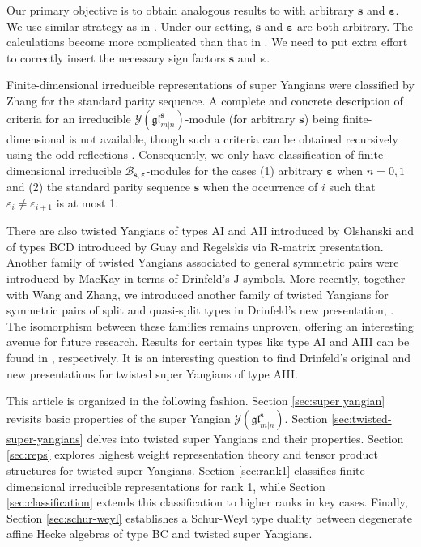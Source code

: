 \documentclass[11pt,reqno]{amsart}
\numberwithin{equation}{section}
\theoremstyle{definition}
\theoremstyle{remark}
\newcommand{\gl}{\mathfrak{gl}}
\newcommand{\ve}{\varepsilon}
\newcommand{\s}{{\bm s}}
\begin{document}
Our primary objective is to obtain analogous results to \cite{Molev2002reflection,Chen2014twisted} with arbitrary $\s$ and $\bm\ve$. We use similar strategy as in \cite{Molev2002reflection,Chen2014twisted}. Under our setting, $\s$ and $\bm\ve$ are both arbitrary. The calculations become more complicated than that in \cite{Molev2002reflection,Chen2014twisted}. We need to put extra effort to correctly insert the necessary sign factors $\s$ and $\bm\ve$.

Finite-dimensional irreducible representations of super Yangians were classified by Zhang \cite{Zhang1995reps,Zhang1996super} for the standard parity sequence. A complete and concrete description of criteria for an irreducible $\mathscr Y(\gl_{m|n}^\s)$-module (for arbitrary $\s$) being finite-dimensional is not available, though such a criteria can be obtained recursively using the odd reflections \cite{Molev2022odd,Lu2022note}. Consequently, we only have classification of finite-dimensional irreducible $\mathscr B_{\s,\bm\ve}$-modules for the cases (1) arbitrary $\bm\ve$ when $n=0,1$ and (2) the standard parity sequence $\s$ when the occurrence of $i$ such that $\ve_i\ne \ve_{i+1}$  is at most 1.

There are also twisted Yangians of types AI and AII introduced by Olshanski \cite{Olshanski1992twisted} and of types BCD introduced by Guay and Regelskis \cite{Guay2016twisted} via R-matrix presentation. Another family of twisted Yangians associated to general symmetric pairs were introduced by MacKay \cite{MacKay2002rational} in terms of Drinfeld's J-symbols. More recently, together with Wang and Zhang, we introduced another family of twisted Yangians for symmetric pairs of split and quasi-split types in Drinfeld's new presentation, \cite{Lu2023drinfeld,Lu2024drinfeld,Lu2024affine}. The isomorphism between these families remains unproven, offering an interesting avenue for future research. Results for certain types like type AI and AIII can be found in \cite{Lu2023drinfeld,Lu2024drinfeld,Chen2014twisted}, respectively. It is an interesting question to find Drinfeld's original and new presentations for twisted super Yangians of type AIII.

This article is organized in the following fashion. Section \ref{sec:super yangian} revisits basic properties of the super Yangian $\mathscr Y(\gl_{m|n}^\s)$. Section \ref{sec:twisted-super-yangians} delves into twisted super Yangians and their properties. Section \ref{sec:reps} explores highest weight representation theory and tensor product structures for twisted super Yangians. Section \ref{sec:rank1} classifies finite-dimensional irreducible representations for rank 1, while Section \ref{sec:classification} extends this classification to higher ranks in key cases. Finally, Section \ref{sec:schur-weyl} establishes a Schur-Weyl type duality between degenerate affine Hecke algebras of type BC and twisted super Yangians.
\end{document}
